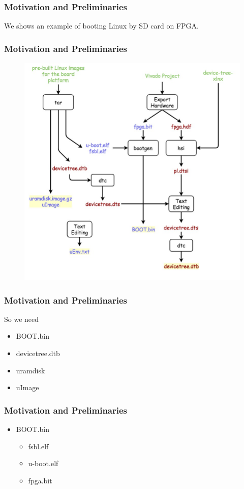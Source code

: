 \documentclass{beamer}
\begin{document}
\begin{frame}
\frametitle{\textcolor[rgb]{0.5,0.5,0.3}{Motivation} and Preliminaries}
We shows an example of booting Linux by SD card on FPGA.
\end{frame}



\begin{frame}
\frametitle{\textcolor[rgb]{0.5,0.5,0.3}{Motivation} and Preliminaries}
\begin{figure}
\centering\includegraphics[scale=0.25]{image/embedded_linux.jpg}
\end{figure}
\end{frame}


\begin{frame}
\frametitle{\textcolor[rgb]{0.5,0.5,0.3}{Motivation} and Preliminaries}
So we need 
\begin{itemize}
\item BOOT.bin
\item devicetree.dtb
\item uramdisk
\item uImage
\end{itemize}
\end{frame}

\begin{frame}
\frametitle{\textcolor[rgb]{0.5,0.5,0.3}{Motivation} and Preliminaries}
\begin{itemize}
\item BOOT.bin
\begin{itemize}
	\item fsbl.elf
	\item u-boot.elf
	\item fpga.bit
\end{itemize}
\end{itemize}
\end{frame}
\end{document}
